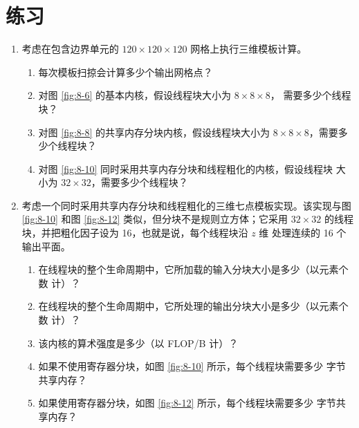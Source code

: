 \section{练习}
\label{sec:stencil-exercises}

\begin{enumerate}
  \item 考虑在包含边界单元的 $120\times120\times120$ 网格上执行三维模板计算。
  \begin{enumerate}[label=\alph*.]
    \item 每次模板扫掠会计算多少个输出网格点？
    \item 对图 \ref{fig:8-6} 的基本内核，假设线程块大小为 $8\times8\times8$，
      需要多少个线程块？
    \item 对图 \ref{fig:8-8} 的共享内存分块内核，假设线程块大小为
      $8\times8\times8$，需要多少个线程块？
    \item 对图 \ref{fig:8-10} 同时采用共享内存分块和线程粗化的内核，假设线程块
      大小为 $32\times32$，需要多少个线程块？
  \end{enumerate}

  \item 考虑一个同时采用共享内存分块和线程粗化的三维七点模板实现。该实现与图
  \ref{fig:8-10} 和图 \ref{fig:8-12} 类似，但分块不是规则立方体；它采用
  $32\times32$ 的线程块，并把粗化因子设为 16，也就是说，每个线程块沿 $z$ 维
  处理连续的 16 个输出平面。
  \begin{enumerate}[label=\alph*.]
    \item 在线程块的整个生命周期中，它所加载的输入分块大小是多少（以元素个数
      计）？
    \item 在线程块的整个生命周期中，它所处理的输出分块大小是多少（以元素个数
      计）？
    \item 该内核的算术强度是多少（以 FLOP/B 计）？
    \item 如果不使用寄存器分块，如图 \ref{fig:8-10} 所示，每个线程块需要多少
      字节共享内存？
    \item 如果使用寄存器分块，如图 \ref{fig:8-12} 所示，每个线程块需要多少
      字节共享内存？
  \end{enumerate}
\end{enumerate}
